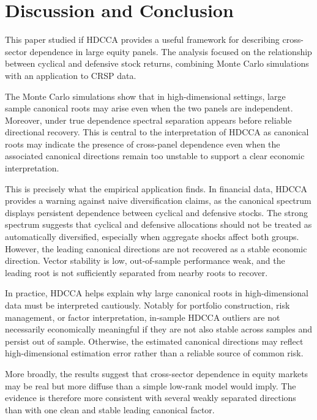 \documentclass[12pt]{report} %
\begin{document}
\chapter{Discussion and Conclusion}
\label{ch:Conclusion}

This paper studied if HDCCA provides a useful framework for describing 
cross-sector dependence in large equity panels. The analysis focused on 
the relationship between cyclical and defensive stock returns, 
combining Monte Carlo simulations with an application to CRSP data.

The Monte Carlo simulations show that in high-dimensional settings, large sample 
canonical roots may arise even when the two panels are independent. 
Moreover, under true dependence spectral separation appears before 
reliable directional recovery. This is central to the interpretation of HDCCA 
as canonical roots may indicate the presence of cross-panel dependence even 
when the associated canonical directions remain too unstable to support a 
clear economic interpretation.

This is precisely what the empirical application finds. In
financial data, HDCCA provides a warning against naive diversification claims, as the 
canonical spectrum displays persistent dependence between 
cyclical and defensive stocks. The strong spectrum suggests that cyclical and 
defensive allocations should not be treated as automatically diversified, 
especially when aggregate shocks affect both groups. However, the leading canonical 
directions are not recovered as a stable economic direction. 
Vector stability is low, out-of-sample performance weak, and the 
leading root is not sufficiently separated from nearby roots to 
recover.

In practice, HDCCA helps explain why large canonical roots in 
high-dimensional data must be interpreted cautiously. Notably for 
portfolio construction, risk management, or factor interpretation,
in-sample HDCCA outliers are not necessarily economically meaningful
if they are not also stable across samples and persist out of sample. 
Otherwise, the estimated canonical directions may reflect
high-dimensional estimation error rather than a reliable source of common risk.

More broadly, the results suggest that cross-sector dependence in equity markets may be real but
more diffuse than a simple low-rank model would imply. The evidence is therefore more consistent
with several weakly separated directions than with one clean and stable leading canonical factor.
\end{document}
